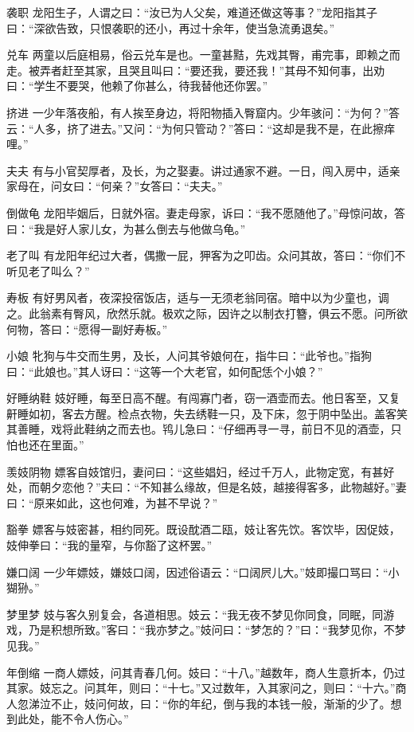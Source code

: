 \documentclass[12pt,UTF8]{ctexbook}
\begin{document}
袭职
龙阳生子，人谓之曰：“汝已为人父矣，难道还做这等事？”龙阳指其子曰：“深欲告致，只恨袭职的还小，再过十余年，使当急流勇退矣。”

兑车
两童以后庭相易，俗云兑车是也。一童甚黠，先戏其臀，甫完事，即赖之而走。被弄者赶至其家，且哭且叫曰：“要还我，要还我！”其母不知何事，出劝曰：“学生不要哭，他赖了你甚么，待我替他还你罢。”

挤进
一少年落夜船，有人挨至身边，将阳物插入臀窟内。少年骇问：“为何？”答云：“人多，挤了进去。”又问：“为何只管动？”答曰：“这却是我不是，在此擦痒哩。”

夫夫
有与小官契厚者，及长，为之娶妻。讲过通家不避。一日，闯入房中，适亲家母在，问女曰：“何亲？”女答曰：“夫夫。”

倒做龟
龙阳毕姻后，日就外宿。妻走母家，诉曰：“我不愿随他了。”母惊问故，答曰：“我是好人家儿女，为甚么倒去与他做乌龟。”

老了叫
有龙阳年纪过大者，偶撒一屁，狎客为之叩齿。众问其故，答曰：“你们不听见老了叫么？”

寿板
有好男风者，夜深投宿饭店，适与一无须老翁同宿。暗中以为少童也，调之。此翁素有臀风，欣然乐就。极欢之际，因许之以制衣打簪，俱云不愿。问所欲何物，答曰：“愿得一副好寿板。”

小娘
牝狗与牛交而生男，及长，人问其爷娘何在，指牛曰：“此爷也。”指狗曰：“此娘也。”其人讶曰：“这等一个大老官，如何配恁个小娘？”

好睡纳鞋
妓好睡，每至日高不醒。有闯寡门者，窃一酒壶而去。他日客至，又复鼾睡如初，客去方醒。检点衣物，失去绣鞋一只，及下床，忽于阴中坠出。盖客笑其善睡，戏将此鞋纳之而去也。鸨儿急曰：“仔细再寻一寻，前日不见的酒壶，只怕也还在里面。”

羡妓阴物
嫖客自妓馆归，妻问曰：“这些娼妇，经过千万人，此物定宽，有甚好处，而朝夕恋他？”夫曰：“不知甚么缘故，但是名妓，越接得客多，此物越好。”妻曰：“原来如此，这也何难，为甚不早说？”

豁拳
嫖客与妓密甚，相约同死。既设酖酒二瓯，妓让客先饮。客饮毕，因促妓，妓伸拳曰：“我的量窄，与你豁了这杯罢。”

嫌口阔
一少年嫖妓，嫌妓口阔，因述俗语云：“口阔屄儿大。”妓即撮口骂曰：“小猢狲。”

梦里梦
妓与客久别复会，各道相思。妓云：“我无夜不梦见你同食，同眠，同游戏，乃是积想所致。”客曰：“我亦梦之。”妓问曰：“梦怎的？”曰：“我梦见你，不梦见我。”

年倒缩
一商人嫖妓，问其青春几何。妓曰：“十八。”越数年，商人生意折本，仍过其家。妓忘之。问其年，则曰：“十七。”又过数年，入其家问之，则曰：“十六。”商人忽涕泣不止，妓问何故，曰：“你的年纪，倒与我的本钱一般，渐渐的少了。想到此处，能不令人伤心。”
\end{document}
